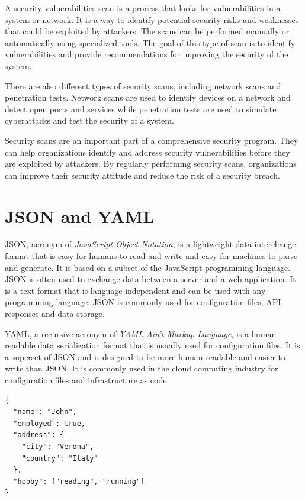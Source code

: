 A security vulnerabilities scan is a process that looks for vulnerabilities in a system or network. It is a way to identify potential security risks and weaknesses that could be exploited by attackers. The scans can be performed manually or automatically using specialized tools. The goal of this type of scan is to identify vulnerabilities and provide recommendations for improving the security of the system.

There are also different types of security scans, including network scans and penetration tests. Network scans are used to identify devices on a network and detect open ports and services while penetration tests are used to simulate cyberattacks and test the security of a system.

Security scans are an important part of a comprehensive security program. They can help organizations identify and address security vulnerabilities before they are exploited by attackers. By regularly performing security scans, organizations can improve their security attitude and reduce the risk of a security breach.

\section{JSON and YAML}

JSON, acronym of \textit{JavaScript Object Notation}, is a lightweight data-interchange format that is easy for humans to read and write and easy for machines to parse and generate. It is based on a subset of the JavaScript programming language. JSON is often used to exchange data between a server and a web application. It is a text format that is language-independent and can be used with any programming language. JSON is commonly used for configuration files, API responses and data storage.

YAML, a recursive acronym of \textit{YAML Ain't Markup Language}, is a human-readable data serialization format that is usually used for configuration files. It is a superset of JSON and is designed to be more human-readable and easier to write than JSON. It is commonly used in the cloud computing industry for configuration files and infrastructure as code.

\begin{minipage}{\linewidth}
  \begin{lstlisting}[style=json, caption={JSON example}, label={lst:json-example}]
{
  "name": "John",
  "employed": true,
  "address": {
    "city": "Verona",
    "country": "Italy"
  },
  "hobby": ["reading", "running"]
}
  \end{lstlisting}
\end{minipage}

